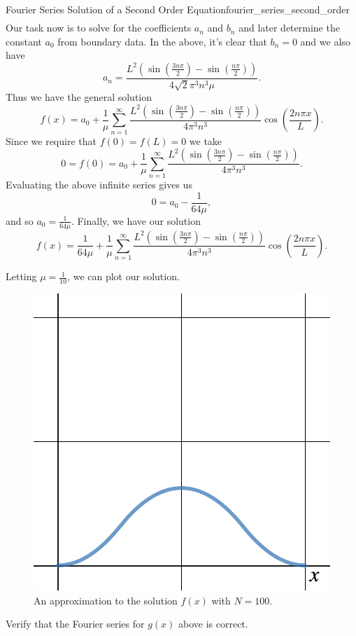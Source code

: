 \begin{ex}{Fourier Series Solution of a Second Order Equation}{fourier_series_second_order}
\begin{align*}
	\end{align*}
	Our task now is to solve for the coefficients $a_n$ and $b_n$ and later determine the constant $a_0$ from boundary data. In the above, it's clear that $b_n=0$ and we also have
	\[
	a_n = \frac{L^2\left(\sin\left(\frac{3 n \pi}{2}\right)-\sin\left(\frac{n\pi}{2}\right)\right)}{4\sqrt{2}\pi^3 n^3\mu}.
	\]
	Thus we have the general solution
	\[
	f(x) = a_0 + \frac{1}{\mu}\sum_{n=1}^\infty \frac{L^2\left(\sin\left(\frac{3 n \pi}{2}\right)-\sin\left(\frac{n\pi}{2}\right)\right)}{4\pi^3 n^3} \cos\left(\frac{2n\pi x}{L}\right).
	\]
	Since we require that $f(0)=f(L)=0$ we take
	\[
	0 = f(0)=a_0 + \frac{1}{\mu}\sum_{n=1}^\infty \frac{L^2\left(\sin\left(\frac{3 n \pi}{2}\right)-\sin\left(\frac{n\pi}{2}\right)\right)}{4\pi^3 n^3}.
	\]
	Evaluating the above infinite series gives us
	\[
	0 = a_0 - \frac{1}{64\mu},
	\]
	and so $a_0=\frac{1}{64\mu}$.  Finally, we have our solution
	\[
	\boxed{f(x) = \frac{1}{64\mu}+ \frac{1}{\mu}\sum_{n=1}^\infty \frac{L^2\left(\sin\left(\frac{3 n \pi}{2}\right)-\sin\left(\frac{n\pi}{2}\right)\right)}{4\pi^3 n^3} \cos\left(\frac{2n\pi x}{L}\right).}
	\]
	
	Letting $\mu=\frac{1}{10}$, we can plot our solution.
	\begin{figure}[H]
		\centering
		\includegraphics[width=.5\textwidth]{Figures_Part_5/square_wave_diffeq_solution.png}
		\caption{An approximation to the solution $f(x)$ with $N=100$.}
	\end{figure}
\end{ex}
	
\begin{exercise}
	Verify that the Fourier series for $g(x)$ above is correct.
\end{exercise}


